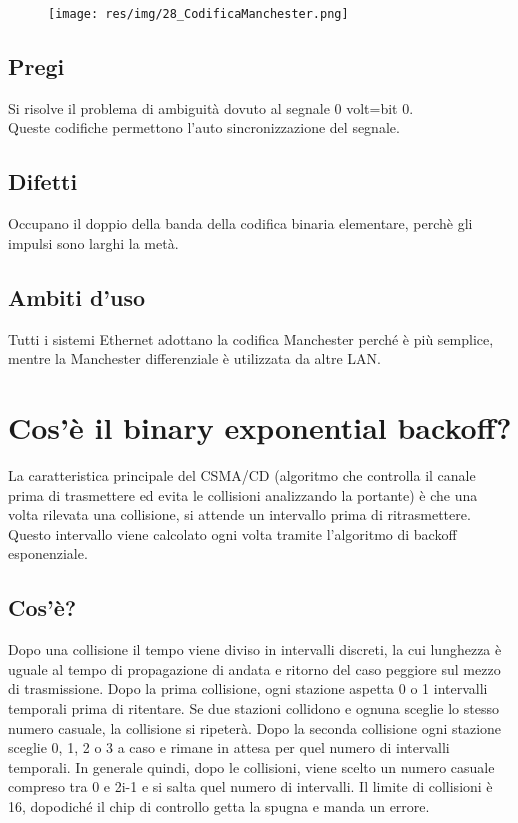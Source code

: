 \begin{figure}[H]
\centering
\texttt{[image: res/img/28\_CodificaManchester.png]}
\end{figure}

\subsection{Pregi}
Si risolve il problema di ambiguità dovuto al segnale 0 volt=bit 0.\\
Queste codifiche permettono l'auto sincronizzazione del segnale.

\subsection{Difetti}
Occupano il doppio della banda della codifica binaria elementare, perchè gli impulsi sono larghi la metà.

\subsection{Ambiti d'uso}
Tutti i sistemi Ethernet adottano la codifica Manchester perché è più semplice, mentre la Manchester differenziale è utilizzata da altre LAN.

\section{Cos'è il binary exponential backoff?}
La caratteristica principale del CSMA/CD (algoritmo che controlla il canale prima di trasmettere ed evita le collisioni analizzando la portante) è che una volta rilevata una collisione, si attende un intervallo prima di ritrasmettere. Questo intervallo viene calcolato ogni volta tramite l'algoritmo di backoff esponenziale.

\subsection{Cos'è?}
Dopo una collisione il tempo viene diviso in intervalli discreti, la cui lunghezza è uguale al tempo di propagazione di andata e ritorno del caso peggiore sul mezzo di trasmissione.
Dopo la prima collisione, ogni stazione aspetta 0 o 1 intervalli temporali prima di ritentare. Se due stazioni collidono e ognuna sceglie lo stesso numero casuale, la collisione si ripeterà. Dopo la seconda collisione ogni stazione sceglie 0, 1, 2 o 3 a caso e rimane in attesa per quel numero di intervalli temporali. In generale quindi, dopo le collisioni, viene scelto un numero casuale compreso tra 0 e 2i-1 e si salta quel numero di intervalli. Il limite di collisioni è 16, dopodiché il chip di controllo getta la spugna e manda un errore.

